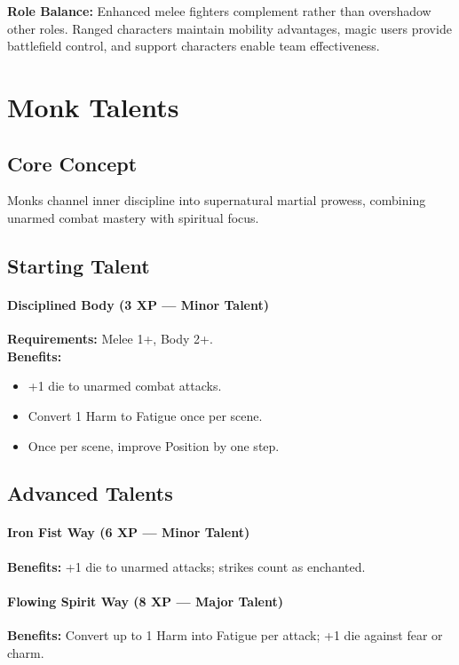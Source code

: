 \textbf{Role Balance:} Enhanced melee fighters complement rather than overshadow other roles. Ranged characters maintain mobility advantages, magic users provide battlefield control, and support characters enable team effectiveness.

\section{Monk Talents}
\label{sec:monk-talents}

\subsection*{Core Concept}
Monks channel inner discipline into supernatural martial prowess, combining unarmed combat mastery with spiritual focus.

\subsection*{Starting Talent}
\paragraph{Disciplined Body (3 XP --- Minor Talent)} 
\textbf{Requirements:} Melee 1+, Body 2+. \\
\textbf{Benefits:}
\begin{itemize}
  \item +1 die to unarmed combat attacks.
  \item Convert 1 Harm to Fatigue once per scene.
  \item Once per scene, improve Position by one step.
\end{itemize}

\subsection*{Advanced Talents}
\paragraph{Iron Fist Way (6 XP --- Minor Talent)} 
\textbf{Benefits:} +1 die to unarmed attacks; strikes count as enchanted.

\paragraph{Flowing Spirit Way (8 XP --- Major Talent)} 
\textbf{Benefits:} Convert up to 1 Harm into Fatigue per attack; +1 die against fear or charm.

